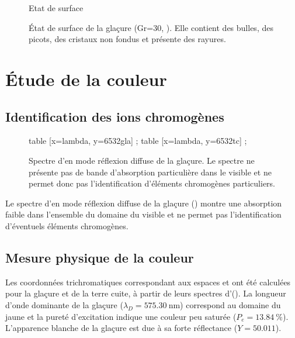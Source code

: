 \begin{figure}[htb]
  Etat de surface
  \caption{\legendeE 
           État de surface de la glaçure (Gr=30, ). Elle contient des bulles, des 
           picots, des cristaux non fondus et présente des rayures.}
  \label{surf:6532}
\end{figure}


\section{Étude de la couleur}

\subsection{Identification des ions chromogènes}
\begin{figure}[htb]
  \begin{plotspectre}
       table [x=lambda, y=6532gla] {\gladata} ;
       table [x=lambda, y=6532tc] {\tcdata} ;
  \end{plotspectre}
  \caption{\legendeE 
           Spectre d'\AO en mode réflexion diffuse de la glaçure. Le spectre ne présente pas de bande d'absorption particulière dans le visible et ne permet donc pas l'identification d'éléments chromogènes particuliers.}
  \label{spectre:6532}
\end{figure}

Le spectre d'\AO en mode réflexion diffuse de la glaçure () montre une absorption faible dans l'ensemble du domaine du visible et ne permet pas l'identification d'éventuels éléments chromogènes.

\subsection{Mesure physique de la couleur}
Les coordonnées trichromatiques correspondant aux espaces \Yxy et \Lab ont été calculées pour la glaçure et de la terre cuite, à partir de leurs spectres d'\AO (). La longueur d'onde dominante de la glaçure ($\lambda_D=\SI{575.30}{\nm}$) correspond au domaine du jaune \autocite{Kelly_1976} et la pureté d'excitation indique une couleur peu saturée ($P_e=\SI{13.84}{\percent}$). L'apparence blanche de la glaçure est due à sa forte réflectance ($Y=\num{50.011}$).


